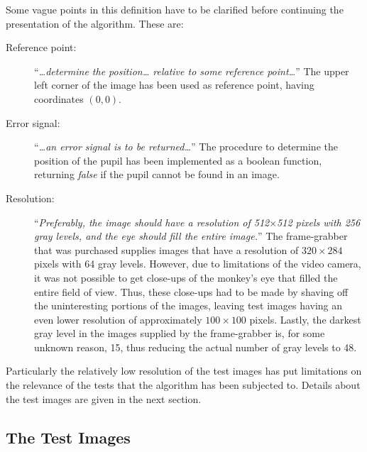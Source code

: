 \noindent Some vague points in this definition have to be clarified
before continuing the presentation of the algorithm.  These are:
\begin{description}
\item[Reference point:] ``{\em\ldots determine the position\ldots
    relative to some reference point\ldots\/}'' The upper left corner
  of the image has been used as reference point, having coordinates
  $(0,0)$.
\item[Error signal:] ``{\em\ldots an error signal is to be
    returned\ldots\/}'' The procedure to determine the position of the
  pupil has been implemented as a boolean function, returning {\em
    false\/} if the pupil cannot be found in an image.
\item[Resolution:] ``{\em Preferably, the image should have a
    resolution of 512$\times$512 pixels with 256 gray levels, and the
    eye should fill the entire image.\/}'' The frame-grabber that was
  purchased supplies images that have a resolution of $320\times 284$
  pixels with 64 gray levels.  However, due to limitations of the
  video camera, it was not possible to get close-ups of the monkey's
  eye that filled the entire field of view.  Thus, these close-ups had
  to be made by shaving off the uninteresting portions of the images,
  leaving test images having an even lower resolution of approximately
  $100\times 100$ pixels.  Lastly, the darkest gray level in the
  images supplied by the frame-grabber is, for some unknown reason,
  15, thus reducing the actual number of gray levels to 48.
\end{description}
Particularly the relatively low resolution of the test images has
put limitations on the relevance of the tests that the algorithm has
been subjected to.  Details about the test images are given in the
next section.

\subsection{The Test Images}
\label{algo:intro:images}

